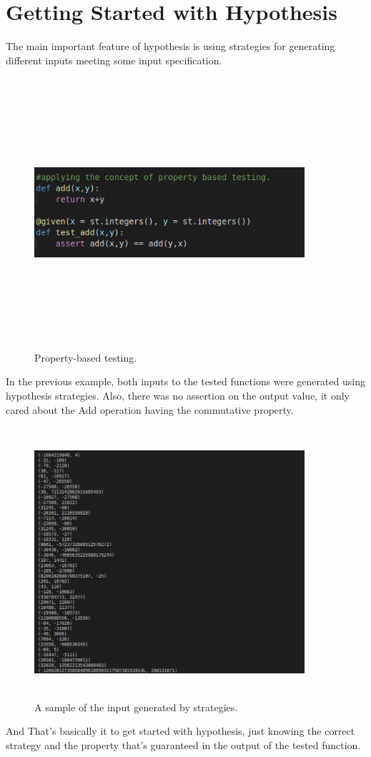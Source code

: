 \documentclass[12pt]{article}
\begin{document}
{\section{{\large Getting Started with Hypothesis}}
The main important feature of hypothesis is using strategies for generating different inputs meeting some input specification.
\begin{figure}[H]
	\includegraphics[width=10cm,height=10cm,keepaspectratio]{testing_0.png}
	\caption{Property-based testing.}
	\label{fig 1: Property-based testing.}
\end{figure}
In the previous example, both inputs to the tested functions were generated using hypothesis strategies. Also, there was no assertion on the output value, it only cared about the Add operation having the commutative property.
\begin{figure}[H]
	\includegraphics[width=10cm,height=10cm,keepaspectratio]{testing_1.png}
	\caption{A sample of the input generated by strategies.}
	\label{fig 2: strategies' input.}
\end{figure}
And That's basically it to get started with hypothesis, just knowing the correct strategy and the property that's guaranteed in the output of the tested function.
 
}
\end{document}
